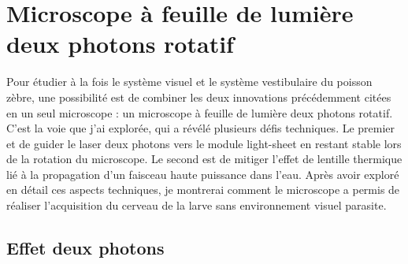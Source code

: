 \chapter{Microscope à feuille de lumière deux photons rotatif}




Pour étudier à la fois le système visuel et le système vestibulaire du poisson zèbre, une possibilité est de combiner les deux innovations précédemment citées en un seul microscope : un microscope à feuille de lumière deux photons rotatif. C'est la voie que j'ai explorée, qui a révélé plusieurs défis techniques. Le premier et de guider le laser deux photons vers le module light-sheet en restant stable lors de la rotation du microscope. Le second est de mitiger l'effet de lentille thermique lié à la propagation d'un faisceau haute puissance dans l'eau. Après avoir exploré en détail ces aspects techniques, je montrerai comment le microscope a permis de réaliser l'acquisition du cerveau de la larve sans environnement visuel parasite.



\section{Effet deux photons}

